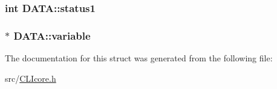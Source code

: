 \hypertarget{structDATA_acc1a46fa384934e24a89660d8d0c9f7a}{
\subsubsection[{status1}]{\setlength{\rightskip}{0pt plus 5cm}int D\+A\+T\+A\+::status1}}\label{structDATA_acc1a46fa384934e24a89660d8d0c9f7a}
\hypertarget{structDATA_a38336f0ef793c2aef2a6f3a20e3e361b}{
\subsubsection[{variable}]{$\ast$ D\+A\+T\+A\+::variable}}\label{structDATA_a38336f0ef793c2aef2a6f3a20e3e361b}


The documentation for this struct was generated from the following file\+:\begin{DoxyCompactItemize}
\item 
src/\hyperlink{CLIcore_8h}{C\+L\+Icore.\+h}\end{DoxyCompactItemize}
